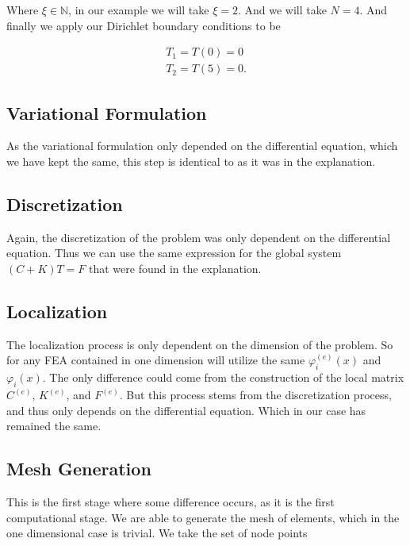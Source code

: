 \documentclass[10pt]{amsart}
\numberwithin{equation}{section}
\theoremstyle{definition}
\newcommand{\N}{\mathbb{N}}
\begin{document}
\begin{multicols}{2}
Where $\xi \in \N$, in our example we will take $\xi=2$. And we will take
$N=4$. And finally we apply our Dirichlet boundary conditions to be

\begin{align*}
  T_1=T(0)=0\\
  T_2=T(5)=0.
\end{align*}

\subsection{Variational Formulation}%
\label{sub:variational_formulation}

As the variational formulation only depended on the differential equation,
which we have kept the same, this step is identical to as it was in the
explanation.

\subsection{Discretization}%
\label{sub:discretization}

Again, the discretization of the problem was only dependent on the differential
equation. Thus we can use the same expression for the global system $(C+K)T=F$
that were found in the explanation.

\subsection{Localization}%
\label{sub:localization}

The localization process is only dependent on the dimension of the problem. So
for any FEA contained in one dimension will utilize the same
$\varphi_i^{(e)}(x)$ and $\varphi_i(x)$. The only difference could come from
the construction of the local matrix $C^{(e)}$, $K^{(e)}$, and $F^{(e)}$. But
this process stems from the discretization process, and thus only depends on
the differential equation. Which in our case has remained the same.

\subsection{Mesh Generation}%
\label{sub:mesh_generation}

This is the first stage where some difference occurs, as it is the first
computational stage. We are able to generate the mesh of elements, which in the
one dimensional case is trivial. We take the set of node points


\end{multicols}
\end{document}
